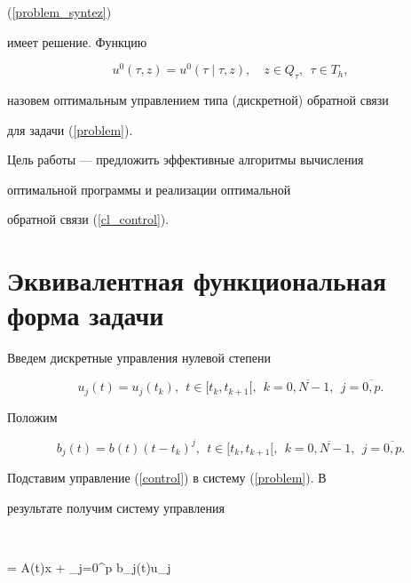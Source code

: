 (\ref{problem_syntez})


имеет решение. Функцию


\begin{equation}\label{cl_control}


u^0(\tau,z) = u^0(\tau\mid \tau,z), \quad z \in Q_\tau, \ \ \tau \in


T_h,


\end{equation}


назовем оптимальным управлением типа (дискретной) обратной связи


для задачи (\ref{problem}).





Цель работы --- предложить эффективные алгоритмы вычисления


оптимальной программы и реализации оптимальной


обратной связи (\ref{cl_control}).








\section{Эквивалентная функциональная форма задачи}








Введем дискретные управления нулевой степени


\begin{equation}\label{contr_0}


u_j(t) = u_j(t_k), \ \ t \in [t_k, t_{k+1}[, \ \ k = \overline{0,N-1},


\ \ j = \overline{0,p}.


\end{equation}


Положим


$$


b_j(t) = b(t)(t-t_k)^j, \ \ t \in [t_k, t_{k+1}[, \ \ k =


\overline{0,N-1}, \ \ j = \overline{0,p}.


$$


Подставим управление (\ref{control}) в систему (\ref{problem}). В


результате получим систему управления


$$


 = A(t)x + \sum\limits_{j=0}^{p} b_j(t)u_j


